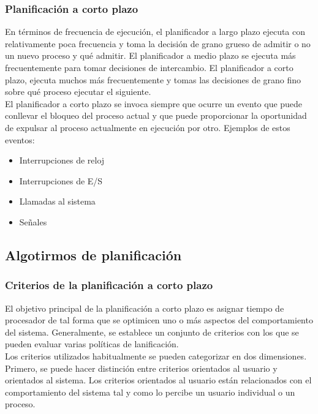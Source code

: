 \documentclass{article}
\begin{document}
			\subsubsection{Planificación a corto plazo}
				En términos de frecuencia de ejecución, el planificador a largo plazo ejecuta con relativamente poca frecuencia y toma la decisión de grano grueso de admitir o no un nuevo proceso y qué admitir. El planificador a medio plazo se ejecuta más frecuentemente para tomar decisiones de intercambio. El planificador a corto plazo, ejecuta muchos más frecuentemente y tomas las decisiones de grano fino sobre qué proceso ejecutar el siguiente. \\
				
				El planificador a corto plazo se invoca siempre que ocurre un evento que puede conllevar el bloqueo del proceso actual y que puede proporcionar la oportunidad de expulsar al proceso actualmente en ejecución por otro. Ejemplos de estos eventos:
				\begin{itemize}
				\item Interrupciones de reloj
				\item Interrupciones de E/S
				\item Llamadas al sistema
				\item Señales
				\end{itemize}
				
		\subsection{Algotirmos de planificación}
			\subsubsection{Criterios de la planificación a corto plazo}
				El objetivo principal de la planificación a corto plazo es asignar tiempo de procesador de tal forma
que se optimicen uno o más aspectos del comportamiento del sistema. Generalmente, se establece un conjunto de criterios con los que se pueden evaluar varias políticas de lanificación. \\
				
				Los criterios utilizados habitualmente se pueden categorizar en dos dimensiones. Primero, se puede hacer distinción entre criterios orientados al usuario y orientados al sistema. Los criterios orientados al usuario están relacionados con el comportamiento del sistema tal y como lo percibe un usuario individual o un proceso. \\
				
\end{document}
